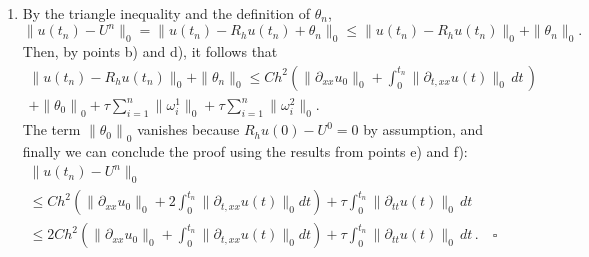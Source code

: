 \documentclass[a4paper]{article}
\newcommand{\dt}{\, dt \,}
\newcommand{\norm}[1]{\left\lVert #1 \right\rVert}
\begin{document}
\begin{enumerate}[label=\textbf{\alph*)},leftmargin=*]
\item By the triangle inequality and the definition of $\theta_n$,
	\[
	\|u(t_n)-U^n\|_0
	=\|u(t_n)-R_hu(t_n)+\theta_n\|_0\leq\|u(t_n)-R_hu(t_n)\|_0+\|\theta_n\|_0.
	\]
	Then, by points b) and d), it follows that
	\begin{multline*}
	\|u(t_n)-R_hu(t_n)\|_0+\|\theta_n\|_0
	\leq Ch^2\left(\|\partial_{xx}u_0\|_0+\int^{t_n}_0\|\partial_{t,xx}u(t)\|_0 \dt\right) \\
	+\norm{\theta_0}_0
	+\tau\sum^n_{i=1}\|\omega^1_i\|_0+\tau\sum^n_{i=1}\|\omega^2_i\|_0.
	\end{multline*}
	The term $\norm{\theta_0}_0$ vanishes because $R_h u(0) - U^0 = 0$ by assumption,
	and finally we can conclude the proof using the results from points e) and f):
	\begin{gather*}
	\|u(t_n)-U^n\|_0 \\
	\leq Ch^2\left(\|\partial_{xx}u_0\|_0
			+2\int^{t_n}_0\|\partial_{t,xx}u(t)\|_0dt\right)
			+\tau\int^{t_n}_0\|\partial_{tt}u(t)\|_0 \dt \\
	\leq 2Ch^2\left(\|\partial_{xx}u_0\|_0+\int^{t_n}_0\|\partial_{t,xx}u(t)\|_0dt\right)
		+\tau\int^{t_n}_0\|\partial_{tt}u(t)\|_0 \dt. \quad \square
	\end{gather*}
\end{enumerate}
\end{document}
